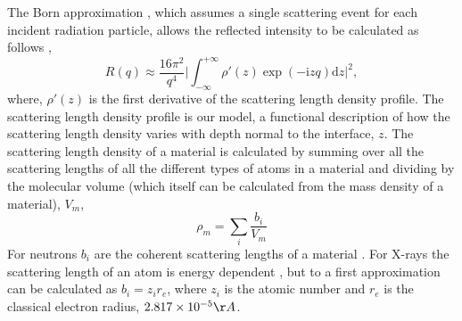 \documentclass[
 reprint,
 superscriptaddress,
 amsmath,amssymb,
 aps,
]{revtex4-1}
\begin{document}
The Born approximation \cite{born_quantenmechanik_1926}, which assumes a single scattering event for each incident radiation particle, allows the reflected intensity to be calculated as follows \cite{sivia_elementary_2011},
%
\begin{equation}
    R(q) \approx \frac{16\pi^2}{q^4} \bigg| \int^{+\infty}_{-\infty}{\rho'(z)\exp{(-\mathrm{i} zq) \text{d}z} \bigg|^2},
    \label{equ:kine}
\end{equation}
%
where, $\rho'(z)$ is the first derivative of the scattering length density profile.
The scattering length density profile is our model, a functional description of how the scattering length density varies with depth normal to the interface, $z$.
 The scattering length density of a material is calculated by summing over all the scattering lengths of all the different types of atoms in a material and dividing by the molecular volume (which itself can be calculated from the mass density of a material), $V_m$,
\begin{equation}
    \rho_m = \sum_{i} \frac{b_i}{V_m}
    \label{equ:sld}
\end{equation}
 For neutrons $b_i$ are the coherent scattering lengths of a material \cite{sears1992, dianoux2003neutron}. For X-rays the scattering length of an atom is energy dependent \cite{xray_form_factor}, but to a first approximation can be calculated as $b_i = z_i  r_e$, where $z_i$ is the atomic number and $r_e$ is the classical electron radius, $2.817 \times 10^{-5} \AA$.
 
\end{document}
